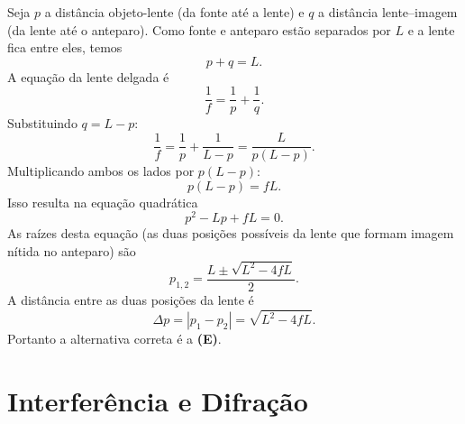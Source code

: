 \documentclass[a4paper,12pt]{article}
\begin{document}
\begin{flushleft}
Seja $p$ a distância objeto-lente (da fonte até a lente) e $q$ a distância lente–imagem (da lente até o anteparo). Como fonte e anteparo estão separados por $L$ e a lente fica entre eles, temos
\[
p+q=L.
\]
A equação da lente delgada é
\[
\frac{1}{f}=\frac{1}{p}+\frac{1}{q}.
\]
Substituindo $q=L-p$:
\[
\frac{1}{f}=\frac{1}{p}+\frac{1}{L-p}=\frac{L}{p(L-p)}.
\]
Multiplicando ambos os lados por $p(L-p)$:
\[
p(L-p)=fL.
\]
Isso resulta na equação quadrática
\[
p^{2}-Lp+fL=0.
\]
As raízes desta equação (as duas posições possíveis da lente que formam imagem nítida no anteparo) são
\[
p_{1,2}=\frac{L\pm\sqrt{L^{2}-4fL}}{2}.
\]
A distância entre as duas posições da lente é
\[
\Delta p=|p_1-p_2|=\sqrt{L^{2}-4fL}.
\]
Portanto a alternativa correta é a \colorbox{green!50}{\textbf{(E)}}.

\end{flushleft}

\section{Interfer\^encia e Difra\c{c}\~ao}
\end{document}
